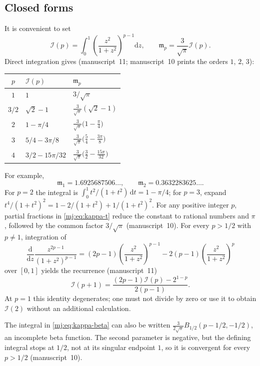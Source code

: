 \documentclass[11pt,a4paper]{article}
\theoremstyle{definition}\newaliascnt{definition}{theorem}
\theoremstyle{remark}\newaliascnt{remark}{theorem}
\newcommand{\dd}{\mathrm d}
\begin{document}
\subsection{Closed forms}
\label{mj:sec:closed-forms}
It is convenient to set
\begin{equation}
 \mathcal I(p)=\int_0^1\left(\frac{z^2}{1+z^2}\right)^{p-1}\dd z,
 \qquad \mathfrak m_p=\frac3{\sqrt\pi}\mathcal I(p).
 \label{mj:eq:Ip}
\end{equation}
Direct integration gives (manuscript~11; manuscript~10 prints the orders
$1$, $2$, $3$):
\begin{center}
\begin{tabular}{cll}
\toprule
$p$ & $\mathcal I(p)$ & $\mathfrak m_p$\\
\midrule
$1$ & $1$ & $3/\sqrt\pi$\\
$3/2$ & $\sqrt2-1$ & $\frac3{\sqrt\pi}(\sqrt2-1)$\\
$2$ & $1-\pi/4$ & $\frac3{\sqrt\pi}\bigl(1-\frac\pi4\bigr)$\\
$3$ & $5/4-3\pi/8$ & $\frac3{\sqrt\pi}\bigl(\frac54-\frac{3\pi}8\bigr)$\\
$4$ & $3/2-15\pi/32$ & $\frac3{\sqrt\pi}\bigl(\frac32-\frac{15\pi}{32}\bigr)$\\
\bottomrule
\end{tabular}
\end{center}
For example,
\[
 \mathfrak m_1=1.6925687506\ldots,
 \qquad \mathfrak m_2=0.3632283625\ldots.
\]
For $p=2$ the integral is $\int_0^1t^2/(1+t^2)\,\dd t=1-\pi/4$; for $p=3$,
expand $t^4/(1+t^2)^2=1-2/(1+t^2)+1/(1+t^2)^2$. For any positive integer
$p$, partial fractions in \eqref{mj:eq:kappa-t} reduce the constant to
rational numbers and $\pi$, followed by the common factor $3/\sqrt\pi$
(manuscript~10). For every $p>1/2$ with $p\ne1$, integration of
\[
 \frac{\dd}{\dd z}
       \frac{z^{2p-1}}{(1+z^2)^{p-1}}
 =(2p-1)\left(\frac{z^2}{1+z^2}\right)^{p-1}
 -2(p-1)\left(\frac{z^2}{1+z^2}\right)^p
\]
over $[0,1]$ yields the recurrence (manuscript~11)
\begin{equation}
 \mathcal I(p+1)=\frac{(2p-1)\mathcal I(p)-2^{1-p}}{2(p-1)}.
 \label{mj:eq:Irecurrence}
\end{equation}
At $p=1$ this identity degenerates; one must not divide by zero or use it to
obtain $\mathcal I(2)$ without an additional calculation.

The integral in \eqref{mj:eq:kappa-beta} can also be written
$\frac3{2\sqrt\pi}B_{1/2}(p-1/2,-1/2)$, an incomplete beta function. The
second parameter is negative, but the defining integral stops at $1/2$, not
at its singular endpoint $1$, so it is convergent for every $p>1/2$
(manuscript~10).
\end{document}
